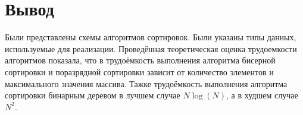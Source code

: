 \section*{Вывод}
Были представлены схемы алгоритмов сортировок. Были указаны типы данных, используемые для реализации. Проведённая теоретическая оценка трудоемкости алгоритмов показала, что в трудоёмкость выполнения алгоритма бисерной сортировки и поразрядной сортировки зависит от количество элементов и максимального значения массива. Тажке трудоёмкость выполнения алгоритма сортировки бинарным деревом в лучшем случае $N\log(N)$, а в худшем случае $N^2$.
